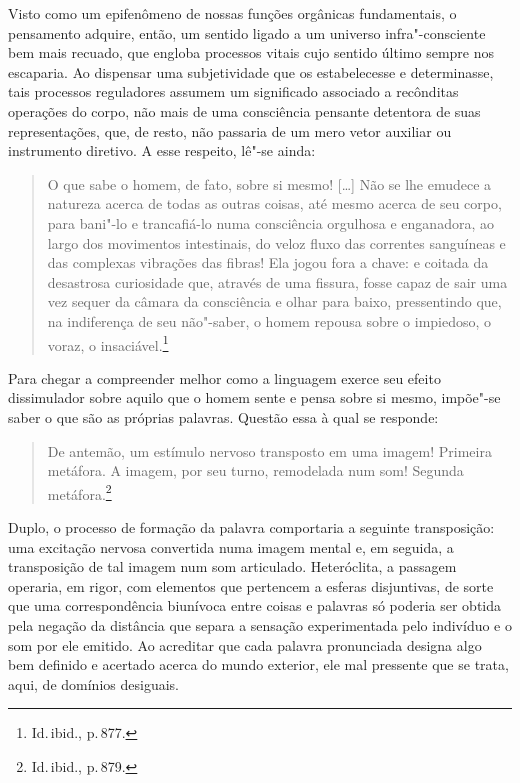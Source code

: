 Visto como um epifenômeno de nossas funções orgânicas fundamentais, o
pensamento adquire, então, um sentido ligado a um universo
infra"-consciente bem mais recuado, que engloba processos vitais cujo
sentido último sempre nos escaparia. Ao dispensar uma subjetividade que
os estabelecesse e determinasse, tais processos reguladores assumem
um significado associado a recônditas operações do corpo, não mais de
uma consciência pensante detentora de suas representações, que, de
resto, não passaria de um mero vetor auxiliar ou instrumento diretivo.
A esse respeito, lê"-se ainda:

\begin{quote}
O que sabe o homem, de fato, sobre si mesmo! [\ldots{}] Não se lhe emudece
a natureza acerca de todas as outras coisas, até mesmo acerca de seu
corpo, para bani"-lo e trancafiá{}-lo numa consciência orgulhosa e
enganadora, ao largo dos movimentos intestinais, do veloz fluxo das
correntes sanguíneas e das complexas vibrações das fibras! Ela jogou
fora a chave: e coitada da desastrosa curiosidade que, através de uma
fissura, fosse capaz de sair uma vez sequer da câmara da consciência e
olhar para baixo, pressentindo que, na indiferença de seu não"-saber,
o homem repousa sobre o impiedoso, o voraz, o
insaciável.\footnote{ Id.\,ibid., p.\,877.}
\end{quote}

Para chegar a compreender melhor como a linguagem exerce seu efeito
dissimulador sobre aquilo que o homem sente e pensa sobre si mesmo,
impõe"-se saber o que são as próprias palavras. Questão essa à qual se
responde: 

\begin{quote}
De antemão, um estímulo nervoso transposto em uma imagem!
Primeira metáfora. A imagem, por seu turno, remodelada num som! Segunda
metáfora.\footnote{ Id.\,ibid., p.\,879.} 
\end{quote}

Duplo, o processo de formação
da palavra comportaria a seguinte transposição: uma excitação nervosa
convertida numa imagem mental e, em seguida, a transposição de tal
imagem num som articulado. Heteróclita, a passagem operaria, em rigor,
com elementos que pertencem a esferas disjuntivas, de sorte
que uma correspondência biunívoca entre coisas e palavras só poderia
ser obtida pela negação da distância que separa a sensação
experimentada pelo indivíduo e o som por ele emitido. Ao acreditar que
cada palavra pronunciada designa algo bem definido e acertado acerca do
mundo exterior, ele mal pressente que se trata, aqui, de domínios desiguais.

